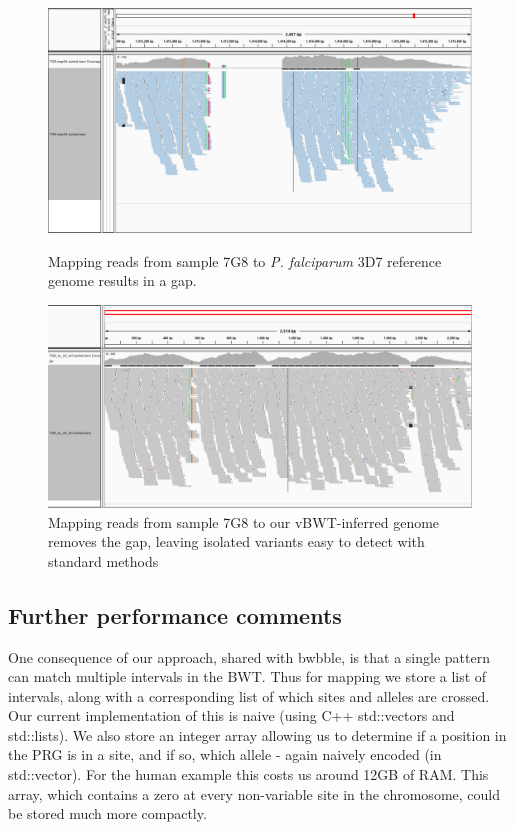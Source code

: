 \documentclass[runningheads,a4paper]{llncs}
\begin{document}
\begin{figure}[!tbp]
  \centering
  \begin{minipage}[b]{0.4\textwidth}
    \includegraphics[width=\textwidth]{7G8_to_3D7_pileup.png}
    \caption{Mapping reads from sample 7G8 to \textit{P. falciparum} 3D7 reference genome results in a gap.}
  \end{minipage}
  \hfill
  \begin{minipage}[b]{0.45\textwidth}
    \includegraphics[width=\textwidth]{7G8_to_inf_ref_pileup.png}
    \caption{Mapping reads from sample 7G8 to our vBWT-inferred genome removes the gap, leaving isolated variants easy to detect with standard methods }
  \end{minipage}
\end{figure}






\subsection{Further performance comments}
One  consequence of our approach, shared with bwbble, is that a single pattern can match multiple intervals in the BWT. Thus for mapping we store a list of intervals, along with a corresponding list of which sites and alleles are crossed. Our current implementation of this is naive (using C++ std::vectors and std::lists). We also store an integer array allowing us to determine if a position in the PRG is in a site, and if so, which allele - again naively encoded (in std::vector). For the human  example this costs us around 12GB of RAM. This  array, which contains a zero at every non-variable site in the chromosome, could be stored much more compactly.
\end{document}
